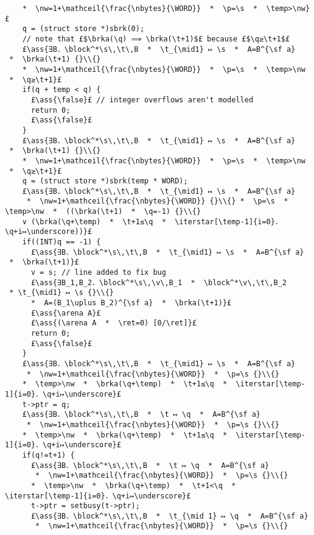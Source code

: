 \documentclass[12pt,a4paper]{article}
\makeatletter
\newcommand{\ml}[2][t]{\mbox{\mdseries\begin{tabular}[#1]{@{}L@{}}#2\end{tabular}}}
\newcommand{\ass}[1]{\ensuremath{{\color{blue}\left\{\ml[c]{#1}\right\}}}}
\newcommand{\iterstar}[2][]{\text{\LARGE $*$}^{#1}_{#2}}
\newcommand{\ret}{\texttt{ret}}
\newcommand{\arena}{\mathop{\emph{arena}}}
\newcommand{\block}{\mathop{\emph{block}}}
\newcommand{\s}{{\tt s}}
\renewcommand{\t}{{\tt t}}
\newcommand{\temp}{{\tt temp}}
\newcommand{\p}{{\tt p}}
\newcommand{\q}{{\tt q}}
\renewcommand{\v}{{\tt v}}
\newcommand{\brka}{\mathop{\emph{brka}}}
\newcommand{\nw}{{\tt nw}}
\newcommand{\nbytes}{{\tt nbytes}}
\newcommand{\WORD}{{\tt WORD}}
\newcommand{\mathceil}[1]{\left\lceil#1\right\rceil}
\makeatother
\begin{document}
\begin{lstlisting}
    *  \nw=1+\mathceil{\frac{\nbytes}{\WORD}}  *  \p=\s  *  \temp>\nw}£
    q = (struct store *)sbrk(0);
    // note that £$\brka(\q) ⟹ \brka(\t+1)$£ because £$\q≥\t+1$£
    £\ass{∃B．\block^*\s\,\t\,B  *  \t_{\mid1} ↦ \s  *  A=B^{\sf a}  *  \brka(\t+1) {}\\{}
    *  \nw=1+\mathceil{\frac{\nbytes}{\WORD}}  *  \p=\s  *  \temp>\nw  *  \q≥\t+1}£
    if(q + temp < q) {
      £\ass{\false}£ // integer overflows aren't modelled
      return 0; 
      £\ass{\false}£      
    }
    £\ass{∃B．\block^*\s\,\t\,B  *  \t_{\mid1} ↦ \s  *  A=B^{\sf a}  *  \brka(\t+1) {}\\{}
    *  \nw=1+\mathceil{\frac{\nbytes}{\WORD}}  *  \p=\s  *  \temp>\nw  *  \q≥\t+1}£
    q = (struct store *)sbrk(temp * WORD);
    £\ass{∃B．\block^*\s\,\t\,B  *  \t_{\mid1} ↦ \s  *  A=B^{\sf a} 
     *  \nw=1+\mathceil{\frac{\nbytes}{\WORD}} {}\\{} *  \p=\s  *  \temp>\nw  *  ((\brka(\t+1)  *  \q=-1) {}\\{}
    ∨ (\brka(\q+\temp)  *  \t+1≤\q  *  \iterstar[\temp-1]{i=0}．\q+i↦\underscore))}£
    if((INT)q == -1) {
      £\ass{∃B．\block^*\s\,\t\,B  *  \t_{\mid1} ↦ \s  *  A=B^{\sf a}  *  \brka(\t+1)}£
      v = s; // line added to fix bug
      £\ass{∃B_1,B_2．\block^*\s\,\v\,B_1  *  \block^*\v\,\t\,B_2  * \t_{\mid1} ↦ \s {}\\{}
      *  A=(B_1\uplus B_2)^{\sf a}  *  \brka(\t+1)}£
      £\ass{\arena A}£
      £\ass{(\arena A  *  \ret=0) [0/\ret]}£
      return 0;
      £\ass{\false}£
    }
    £\ass{∃B．\block^*\s\,\t\,B  *  \t_{\mid1} ↦ \s  *  A=B^{\sf a} 
     *  \nw=1+\mathceil{\frac{\nbytes}{\WORD}}  *  \p=\s {}\\{}
    *  \temp>\nw  *  \brka(\q+\temp)  *  \t+1≤\q  *  \iterstar[\temp-1]{i=0}．\q+i↦\underscore}£
    t->ptr = q;
    £\ass{∃B．\block^*\s\,\t\,B  *  \t ↦ \q  *  A=B^{\sf a} 
     *  \nw=1+\mathceil{\frac{\nbytes}{\WORD}}  *  \p=\s {}\\{}
    *  \temp>\nw  *  \brka(\q+\temp)  *  \t+1≤\q  *  \iterstar[\temp-1]{i=0}．\q+i↦\underscore}£
    if(q!=t+1) {
      £\ass{∃B．\block^*\s\,\t\,B  *  \t ↦ \q  *  A=B^{\sf a} 
       *  \nw=1+\mathceil{\frac{\nbytes}{\WORD}}  *  \p=\s {}\\{}
      *  \temp>\nw  *  \brka(\q+\temp)  *  \t+1<\q  *  \iterstar[\temp-1]{i=0}．\q+i↦\underscore}£
      t->ptr = setbusy(t->ptr);
      £\ass{∃B．\block^*\s\,\t\,B  *  \t_{\mid 1} ↦ \q  *  A=B^{\sf a}
       *  \nw=1+\mathceil{\frac{\nbytes}{\WORD}}  *  \p=\s {}\\{}

\end{lstlisting}
\end{document}
